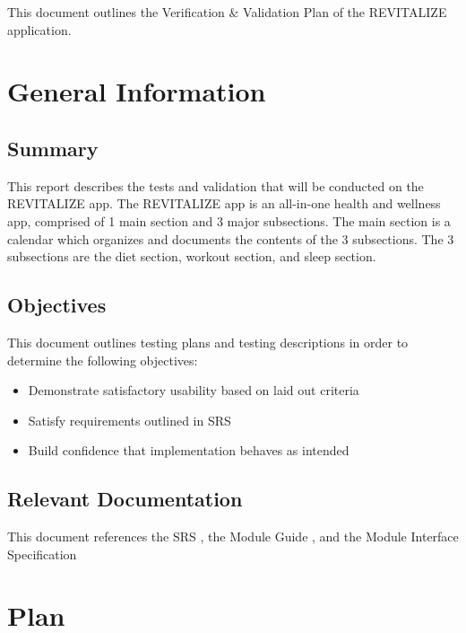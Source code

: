 \documentclass[12pt, titlepage]{article}
\begin{document}

\noindent This document outlines the Verification \& Validation Plan of the REVITALIZE application.

\section{General Information}

\subsection{Summary}

\noindent This report describes the tests and validation that will be conducted on the REVITALIZE app. The REVITALIZE app is an all-in-one health and wellness app, comprised of 1 main section and 3 major subsections. The main section is a calendar which organizes and documents the contents of the 3 subsections. The 3 subsections are the diet section, workout section, and sleep section.

\subsection{Objectives}

\noindent This document outlines testing plans and testing descriptions in order to determine the following objectives: 
\begin{itemize}
	\item Demonstrate satisfactory usability based on laid out criteria
	\item Satisfy requirements outlined in SRS
	\item Build confidence that implementation behaves as intended
\end{itemize}


\subsection{Relevant Documentation}

\noindent This document references the SRS \citet{SRS}, the Module Guide \citet{MG}, and the Module Interface Specification \citet{MIS}


\section{Plan}

\end{document}
